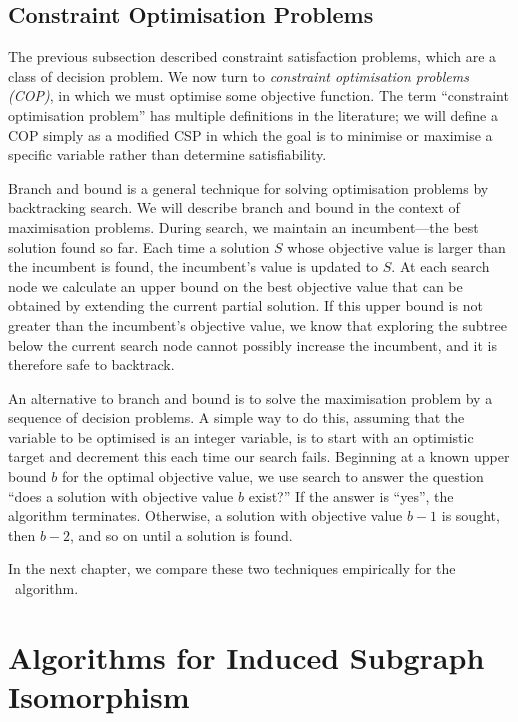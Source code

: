 \subsection{Constraint Optimisation Problems}

The previous subsection described constraint satisfaction problems, which are a
class of decision problem. We now turn to \emph{constraint optimisation
problems (COP)}, in which we must optimise some objective function.  The term
``constraint optimisation problem'' has multiple definitions in the literature;
we will define a COP simply as a modified CSP in which the goal is to minimise
or maximise a specific variable rather than determine satisfiability.

Branch and bound \citep{land2010automatic} is a general technique for solving
optimisation problems by backtracking search. We will describe branch and bound
in the context of maximisation problems.  
During search, we maintain an incumbent---the best solution found so far. Each
time a solution $S$ whose objective value is larger than the incumbent is found,
the incumbent’s value is updated to $S$. At each search node we calculate an
upper bound on the best objective value that can be obtained by extending the
current partial solution. If this upper bound is not greater than the
incumbent’s objective value, we know that exploring the subtree below the
current search node cannot possibly increase the incumbent, and it is therefore
safe to backtrack.

An alternative to branch and bound is to solve the maximisation problem by a
sequence of decision problems.  A simple way to do this, assuming that the
variable to be optimised is an integer variable, is to start with an optimistic
target and decrement this each time our search fails.  Beginning at a known
upper bound $b$ for the optimal objective value, we use search to answer the
question “does a solution with objective value $b$ exist?” If the answer is
“yes”, the algorithm terminates. Otherwise, a solution with objective value
$b-1$ is sought, then $b-2$, and so on until a solution is found.

In the next chapter, we compare these two techniques empirically for
the \McSplit\ algorithm.

\section{Algorithms for Induced Subgraph Isomorphism}\label{sec:si-algorithms}

